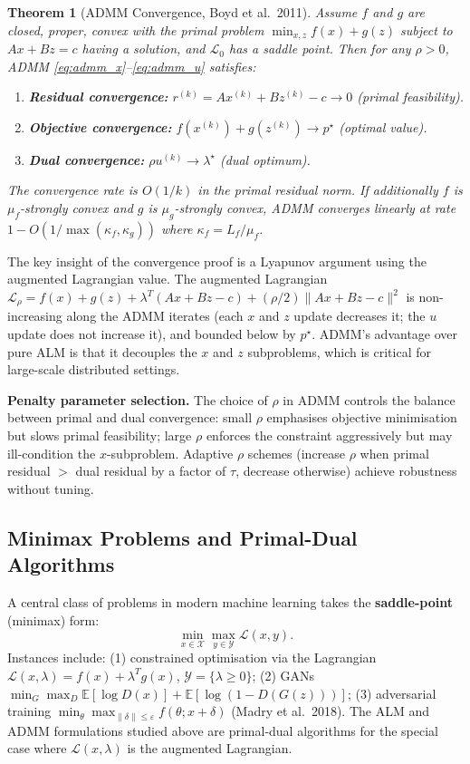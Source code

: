 \documentclass[11pt,a4paper]{article}
\newtheorem{theorem}{Theorem}[section]
\theoremstyle{definition}
\begin{document}
\begin{theorem}[ADMM Convergence, Boyd et al.\ 2011]
\label{thm:admm}
Assume $f$ and $g$ are closed, proper, convex with the primal problem $\min_{x,z} f(x) + g(z)$ subject to $Ax + Bz = c$ having a solution, and $\mathcal{L}_0$ has a saddle point. Then for any $\rho > 0$, ADMM \eqref{eq:admm_x}--\eqref{eq:admm_u} satisfies:
\begin{enumerate}
\item \textbf{Residual convergence:} $r^{(k)} = Ax^{(k)} + Bz^{(k)} - c \to 0$ (primal feasibility).
\item \textbf{Objective convergence:} $f(x^{(k)}) + g(z^{(k)}) \to p^{\star}$ (optimal value).
\item \textbf{Dual convergence:} $\rho u^{(k)} \to \lambda^{\star}$ (dual optimum).
\end{enumerate}
The convergence rate is $O(1/k)$ in the primal residual norm. If additionally $f$ is $\mu_f$-strongly convex and $g$ is $\mu_g$-strongly convex, ADMM converges \emph{linearly} at rate $1 - O(1/\max(\kappa_f, \kappa_g))$ where $\kappa_{f} = L_f/\mu_f$.
\end{theorem}

The key insight of the convergence proof is a Lyapunov argument using the augmented Lagrangian value. The augmented Lagrangian $\mathcal{L}_\rho = f(x) + g(z) + \lambda^T(Ax + Bz - c) + (\rho/2)\|Ax + Bz - c\|^2$ is non-increasing along the ADMM iterates (each $x$ and $z$ update decreases it; the $u$ update does not increase it), and bounded below by $p^{\star}$. ADMM's advantage over pure ALM is that it decouples the $x$ and $z$ subproblems, which is critical for large-scale distributed settings.

\noindent\textbf{Penalty parameter selection.} The choice of $\rho$ in ADMM controls the balance between primal and dual convergence: small $\rho$ emphasises objective minimisation but slows primal feasibility; large $\rho$ enforces the constraint aggressively but may ill-condition the $x$-subproblem. Adaptive $\rho$ schemes (increase $\rho$ when primal residual $>$ dual residual by a factor of $\tau$, decrease otherwise) achieve robustness without tuning.

\subsection{Minimax Problems and Primal-Dual Algorithms}

A central class of problems in modern machine learning takes the \textbf{saddle-point} (minimax) form:
\begin{equation}
\min_{x \in \mathcal{X}} \max_{y \in \mathcal{Y}} \mathcal{L}(x, y).
\label{eq:minimax}
\end{equation}
Instances include: (1) constrained optimisation via the Lagrangian $\mathcal{L}(x, \lambda) = f(x) + \lambda^T g(x)$, $\mathcal{Y} = \{\lambda \geq 0\}$; (2) GANs $\min_G \max_D \mathbb{E}[\log D(x)] + \mathbb{E}[\log(1-D(G(z)))]$; (3) adversarial training $\min_\theta \max_{\|\delta\| \leq \varepsilon} f(\theta; x + \delta)$ (Madry et al.\ 2018). The ALM and ADMM formulations studied above are primal-dual algorithms for the special case where $\mathcal{L}(x,\lambda)$ is the augmented Lagrangian.
\end{document}
